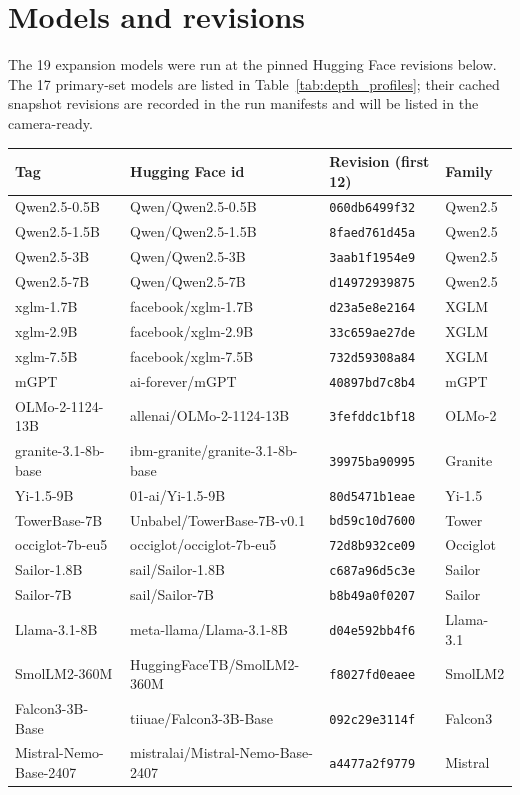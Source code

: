 \documentclass{article} %
\begin{document}
\section{Models and revisions}
\label{app:models}
The 19 expansion models were run at the pinned Hugging Face revisions below. The 17 primary-set models are listed in Table~\ref{tab:depth_profiles}; their cached snapshot revisions are recorded in the run manifests and will be listed in the camera-ready.
\begin{center}\scriptsize
\begin{tabular}{llll}
\toprule
Tag & Hugging Face id & Revision (first 12) & Family \\
\midrule
Qwen2.5-0.5B & Qwen/Qwen2.5-0.5B & \texttt{060db6499f32} & Qwen2.5 \\
Qwen2.5-1.5B & Qwen/Qwen2.5-1.5B & \texttt{8faed761d45a} & Qwen2.5 \\
Qwen2.5-3B & Qwen/Qwen2.5-3B & \texttt{3aab1f1954e9} & Qwen2.5 \\
Qwen2.5-7B & Qwen/Qwen2.5-7B & \texttt{d14972939875} & Qwen2.5 \\
xglm-1.7B & facebook/xglm-1.7B & \texttt{d23a5e8e2164} & XGLM \\
xglm-2.9B & facebook/xglm-2.9B & \texttt{33c659ae27de} & XGLM \\
xglm-7.5B & facebook/xglm-7.5B & \texttt{732d59308a84} & XGLM \\
mGPT & ai-forever/mGPT & \texttt{40897bd7c8b4} & mGPT \\
OLMo-2-1124-13B & allenai/OLMo-2-1124-13B & \texttt{3fefddc1bf18} & OLMo-2 \\
granite-3.1-8b-base & ibm-granite/granite-3.1-8b-base & \texttt{39975ba90995} & Granite \\
Yi-1.5-9B & 01-ai/Yi-1.5-9B & \texttt{80d5471b1eae} & Yi-1.5 \\
TowerBase-7B & Unbabel/TowerBase-7B-v0.1 & \texttt{bd59c10d7600} & Tower \\
occiglot-7b-eu5 & occiglot/occiglot-7b-eu5 & \texttt{72d8b932ce09} & Occiglot \\
Sailor-1.8B & sail/Sailor-1.8B & \texttt{c687a96d5c3e} & Sailor \\
Sailor-7B & sail/Sailor-7B & \texttt{b8b49a0f0207} & Sailor \\
Llama-3.1-8B & meta-llama/Llama-3.1-8B & \texttt{d04e592bb4f6} & Llama-3.1 \\
SmolLM2-360M & HuggingFaceTB/SmolLM2-360M & \texttt{f8027fd0eaee} & SmolLM2 \\
Falcon3-3B-Base & tiiuae/Falcon3-3B-Base & \texttt{092c29e3114f} & Falcon3 \\
Mistral-Nemo-Base-2407 & mistralai/Mistral-Nemo-Base-2407 & \texttt{a4477a2f9779} & Mistral \\
\bottomrule
\end{tabular}
\end{center}
\end{document}
